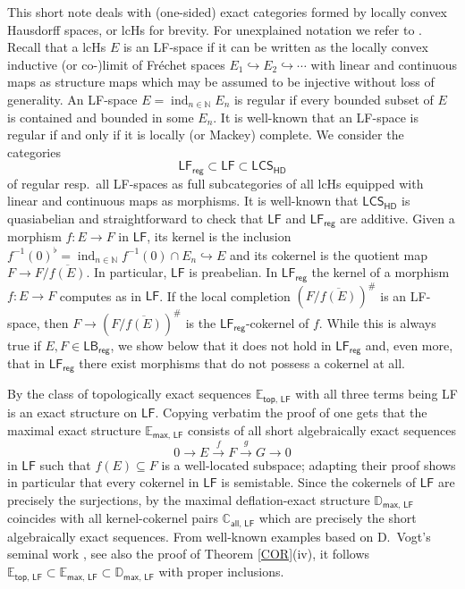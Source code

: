 \documentclass[11pt, a4paper, reqno]{amsart}
\theoremstyle{definition}
\newcommand{\ind}{\operatorname{ind}\nolimits}
\newcommand{\NN}{\mathbb{N}}
\newcommand{\CC}{\mathbb{C}}
\newcommand{\EE}{\mathbb{E}}
\newcommand{\DD}{\mathbb{D}}
\newcommand{\HDLCS}{\mathsf{LCS}_{\mathsf{HD}}}
\newcommand{\LF}{\mathsf{LF}}
\newcommand{\LBr}{\mathsf{LB}_{\mathsf{reg}}}
\newcommand{\LFr}{\mathsf{LF}_{\mathsf{reg}}}
\renewcommand{\sharp}{\texttt{\#}}
\begin{document}
This short note deals with (one-sided) exact categories formed by locally convex Hausdorff spaces, or lcHs for brevity. For unexplained notation we refer to \cite{BPC, Prosmans, MV, HKRW}. Recall that a lcHs $E$ is an LF-space if it can be written as the locally convex inductive (or co\hspace{1pt}-)limit of Fr\'echet spaces $E_1\hookrightarrow E_2\hookrightarrow\cdots$ with linear and continuous maps as structure maps which may be assumed to be injective without loss of generality. An LF-space $E=\ind_{n\in\NN}E_n$ is regular if every bounded subset of $E$ is contained and bounded in some $E_n$. It is well-known that an LF-space is regular if and only if it is locally (or Mackey) complete. We consider the categories
$$
\LFr\subset\LF\subset\HDLCS
$$
of regular resp.\ all LF-spaces as full subcategories of all lcHs equipped with linear and continuous maps as morphisms. It is well-known that $\HDLCS$ is quasiabelian and straightforward to check that $\LF$ and $\LFr$ are additive. Given a morphism $f\colon E\rightarrow F$ in $\LF$, its kernel is the inclusion $f^{-1}(0)^{\flat}=\ind_{n\in\NN}f^{-1}(0)\cap E_n\hookrightarrow E$ and its cokernel is the quotient map $F\rightarrow F/\overline{f(E)}$. In particular, $\LF$ is preabelian. In $\LFr$ the  kernel of a morphism $f\colon E\rightarrow F$ computes as in $\LF$. If the local completion $(F/\overline{f(E)})^{\sharp}$ is an LF-space, then $F\rightarrow(F/\overline{f(E)})^{\sharp}$ is the $\LFr$-cokernel of $f$. While this is always true if $E,F\in\LBr$, we show below that it does not hold in $\LFr$ and, even more, that in $\LFr$ there exist morphisms that do not possess a cokernel at all.

\smallskip

By \cite[Table on p.~2114]{DS12} the class of topologically exact sequences $\EE_{\mathsf{top},\,\LF}$ with all three terms being LF is an exact structure on $\LF$. Copying verbatim the proof of \cite[Prop 3.1.2]{DS16} one gets that the maximal exact structure $\EE_{\mathsf{max},\,\LF}$ consists of all short algebraically exact sequences
\begin{equation}\label{SES}
0\longrightarrow E\stackrel{f}{\longrightarrow}F\stackrel{g}{\longrightarrow}G\longrightarrow0
\end{equation}
in $\LF$ such that $f(E)\subseteq F$ is a well-located subspace; adapting their proof shows in particular that every cokernel in $\LF$ is semistable. Since the cokernels of $\LF$ are precisely the surjections, by \cite[Prop 9.2]{HR24} the maximal deflation-exact structure $\DD_{\mathsf{max},\,\LF}$ coincides with all kernel-cokernel pairs $\CC_{\mathsf{all},\,\LF}$ which are precisely the short algebraically exact sequences. From well-known examples based on D.~Vogt's seminal work \cite{Vogt92}, see also the proof of Theorem \ref{COR}(iv), it follows $\EE_{\mathsf{top},\,\LF}\subset\EE_{\mathsf{max},\,\LF}\subset\DD_{\mathsf{max},\,\LF}$ with proper inclusions. 
\end{document}
